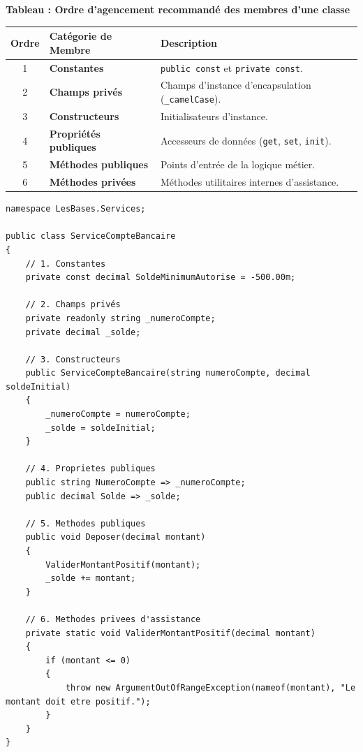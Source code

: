 \begin{center}
    \textbf{Tableau : Ordre d'agencement recommandé des membres d'une classe} \\[0.3cm]
    \begin{tabular}{@{}c>{\bfseries}lp{8.5cm}@{}}
        \toprule
        \textbf{Ordre} & \textbf{Catégorie de Membre} & \textbf{Description} \\
        \midrule
        1 & Constantes & \texttt{public const} et \texttt{private const}. \\
        2 & Champs privés & Champs d'instance d'encapsulation (\texttt{\_camelCase}). \\
        3 & Constructeurs & Initialisateurs d'instance. \\
        4 & Propriétés publiques & Accesseurs de données (\texttt{get}, \texttt{set}, \texttt{init}). \\
        5 & Méthodes publiques & Points d'entrée de la logique métier. \\
        6 & Méthodes privées & Méthodes utilitaires internes d'assistance. \\
        \bottomrule
    \end{tabular}
\end{center}

\begin{lstlisting}[caption={Exemple de structure canonique d'un service C\#}]
namespace LesBases.Services;

public class ServiceCompteBancaire
{
    // 1. Constantes
    private const decimal SoldeMinimumAutorise = -500.00m;

    // 2. Champs privés
    private readonly string _numeroCompte;
    private decimal _solde;

    // 3. Constructeurs
    public ServiceCompteBancaire(string numeroCompte, decimal soldeInitial)
    {
        _numeroCompte = numeroCompte;
        _solde = soldeInitial;
    }

    // 4. Proprietes publiques
    public string NumeroCompte => _numeroCompte;
    public decimal Solde => _solde;

    // 5. Methodes publiques
    public void Deposer(decimal montant)
    {
        ValiderMontantPositif(montant);
        _solde += montant;
    }

    // 6. Methodes privees d'assistance
    private static void ValiderMontantPositif(decimal montant)
    {
        if (montant <= 0)
        {
            throw new ArgumentOutOfRangeException(nameof(montant), "Le montant doit etre positif.");
        }
    }
}
\end{lstlisting}



